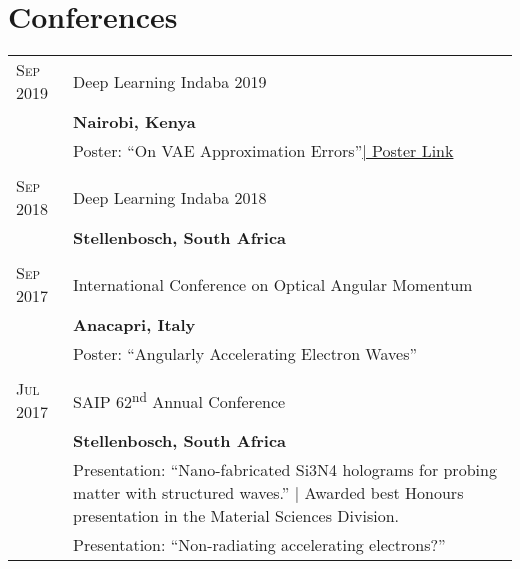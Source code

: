 \section{Conferences}

\begin{tabular}{p{1.8cm}|p{12cm}}
	\textsc{Sep} 2019 & Deep Learning Indaba 2019 \\
	& \textbf{Nairobi, Kenya} \\
	& \small{Poster: ``On VAE Approximation Errors''\href{https://drive.google.com/file/d/1V9z54ngcrdxrn5kBbgTzPTeNhwfJBX-n/view?usp=sharing}{\hfill| Poster Link}} \\
	\multicolumn{2}{c}{} \\
	\textsc{Sep} 2018 & Deep Learning Indaba 2018 \\
	& \textbf{Stellenbosch, South Africa} \\
	\multicolumn{2}{c}{} \\
	\textsc{Sep} 2017 & International Conference on Optical Angular Momentum \\
	& \textbf{Anacapri, Italy} \\
	& \small{Poster: ``Angularly Accelerating Electron Waves''} \\
	\multicolumn{2}{c}{} \\
	\textsc{Jul} 2017 & SAIP 62\textsuperscript{nd} Annual Conference \\
	& \textbf{Stellenbosch, South Africa} \\
	& \small{Presentation: ``Nano-fabricated Si3N4 holograms for probing matter with structured waves.'' | Awarded best Honours presentation in the Material Sciences Division.} \\
	& \small{Presentation: ``Non-radiating accelerating electrons?''}
\end{tabular}
